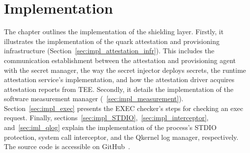 \chapter{Implementation}
\label{sec:implementation}



The chapter outlines the implementation of the shielding layer. Firstly, it illustrates the implementation of the quark attestation and provisioning infrastructure (Section~\ref{sec:impl_attestation_infr}). This includes the communication establishment between the attestation and provisioning agent 
with the secret manager, the way the secret injector deploys secrets, the runtime attestation service's implementation, and how the attestation driver acquires attestation reports from \acrshort{TEE}. Secondly, it details the implementation of the software measurement manager (~\ref{sec:impl_measurement}). 
Section~\ref{sec:impl_exec} presents the EXEC checker's steps for checking an exec request. Finally, sections~\ref{sec:impl_STDIO},~\ref{sec:impl_interceptor}, and~\ref{sec:iml_qlog} explain the implementation of the process's STDIO protection, system call 
interceptor, and the Qkernel log manager, respectively. The source code is accessible on GitHub~\cite*{theis_source_code}.

